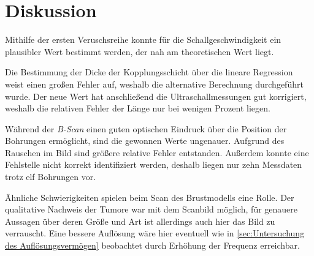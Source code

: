\section{Diskussion}
\label{sec:Diskussion}
Mithilfe der ersten Veruschsreihe konnte für die Schallgeschwindigkeit ein plausibler
Wert bestimmt werden, der nah am theoretischen Wert liegt.

Die Bestimmung der Dicke der Kopplungsschicht über die lineare Regression weist einen großen Fehler auf,
weshalb die alternative Berechnung durchgeführt wurde.
Der neue Wert hat anschließend die Ultraschallmessungen gut korrigiert, weshalb die relativen
Fehler der Länge nur bei wenigen Prozent liegen.

Während der \textit{B-Scan} einen guten optischen Eindruck über die Position der Bohrungen ermöglicht,
sind die gewonnen Werte ungenauer. Aufgrund des Rauschen im Bild sind größere relative Fehler entstanden.
Außerdem konnte eine Fehlstelle nicht korrekt identifiziert werden, deshalb liegen nur zehn Messdaten
trotz elf Bohrungen vor.

Ähnliche Schwierigkeiten spielen beim Scan des Brustmodells eine Rolle. Der qualitative Nachweis der Tumore
war mit dem Scanbild möglich, für genauere Aussagen über deren Größe und Art ist allerdings auch hier das
Bild zu verrauscht. Eine bessere Auflösung wäre hier eventuell wie in \autoref{sec:Untersuchung des Auflösungsvermögen}
beobachtet durch Erhöhung der Frequenz erreichbar.